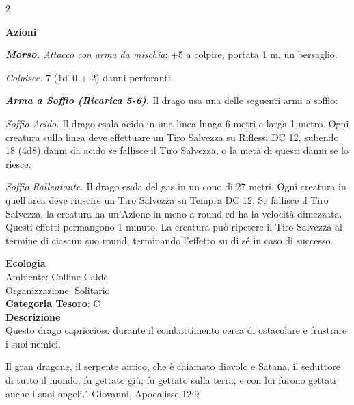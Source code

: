 \begin{multicols}{2}
{\textbf{Azioni}

\emph{\textbf{Morso.} Attacco con arma da mischia}: +5 a colpire, portata 1 m, un bersaglio.

\emph{Colpisce:} 7 (1d10 + 2) danni perforanti.

\emph{\textbf{Arma a Soffio (Ricarica 5-6).}} Il drago usa una delle seguenti armi a soffio:

\emph{Soffio Acido.} Il drago esala acido in una linea lunga 6 metri e larga 1 metro. Ogni creatura sulla linea deve effettuare un Tiro Salvezza su Riflessi DC 12, subendo 18 (4d8) danni da acido se fallisce il Tiro Salvezza, o la metà di questi danni se lo riesce.

\emph{Soffio Rallentante.} Il drago esala del gas in un cono di 27 metri. Ogni creatura in quell'area deve riuscire un Tiro Salvezza su Tempra DC 12. Se fallisce il Tiro Salvezza, la creatura ha un'Azione in meno a round ed ha la velocità dimezzata. Questi effetti permangono 1 minuto. La creatura può ripetere il Tiro Salvezza al termine di ciascun suo round, terminando l'effetto su di sé in caso di successo.

\textbf{Ecologia}\\
Ambiente: Colline Calde\\
Organizzazione: Solitario\\
\textbf{Categoria Tesoro}: C\\
\textbf{Descrizione}\\
Questo drago capriccioso durante il combattimento cerca di ostacolare e frustrare i suoi nemici.

\begin{enfasi}{Il gran dragone, il serpente antico, che è chiamato diavolo e Satana, il seduttore di tutto il mondo, fu gettato giù; fu gettato sulla terra, e con lui furono gettati anche i suoi angeli." Giovanni, Apocalisse 12:9}\end{enfasi}

}
\end{multicols}
